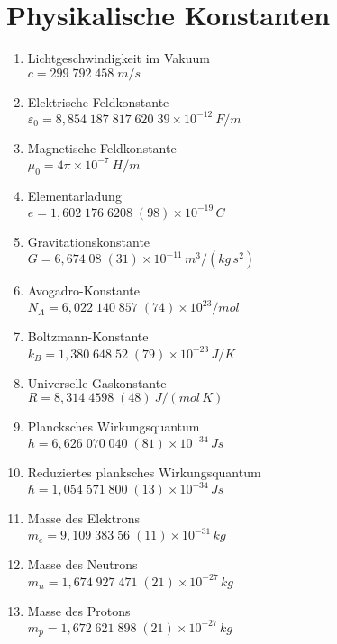 \section{Physikalische Konstanten}
\begin{enumerate}
\item Lichtgeschwindigkeit im Vakuum\\
$c=299\;792\;458\;\unit{m/s}$

\item Elektrische Feldkonstante\\
$\varepsilon_0 = 8{,}854\;187\;817\;620\;39\times 10^{-12}\:\unit{F/m}$

\item Magnetische Feldkonstante\\
$\mu_0 = 4\pi\times 10^{-7}\:\unit{H/m}$

\item Elementarladung\\
$e = 1{,}602\;176\;6208\;(98)\times 10^{-19}\,\unit{C}$

\item Gravitationskonstante\\
$G = 6{,}674\;08\;(31)\times 10^{-11}\,\unit{m^3/(kg\,s^2)}$

\item Avogadro-Konstante\\
$N_A = 6{,}022\;140\;857\;(74)\times 10^{23}/\unit{mol}$

\item Boltzmann-Konstante\\
$k_B = 1{,}380\;648\;52\;(79)\times 10^{-23}\,\unit{J/K}$

\item Universelle Gaskonstante\\
$R = 8{,}314\;4598\;(48)\:\unit{J/(mol\,K)}$

\item Plancksches Wirkungsquantum\\
$h = 6{,}626\;070\;040\;(81)\times 10^{-34}\,\unit{Js}$

\item Reduziertes planksches Wirkungsquantum\\
$\hbar = 1{,}054\;571\;800\;(13)\times 10^{-34}\,\unit{Js}$

\item Masse des Elektrons\\
$m_e = 9{,}109\;383\;56\;(11)\times 10^{-31}\,\unit{kg}$

\item Masse des Neutrons\\
$m_n = 1{,}674\;927\;471\;(21)\times 10^{-27}\,\unit{kg}$

\item Masse des Protons\\
$m_p = 1{,}672\;621\;898\;(21)\times 10^{-27}\,\unit{kg}$
\end{enumerate}

